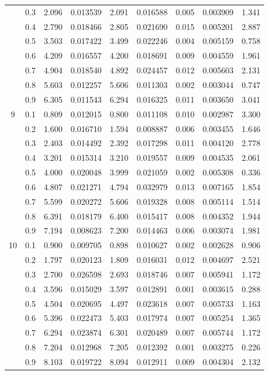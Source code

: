 \begin{longtable}{ | c | c || c | c | c | c | c | c | c | }
 & 0.3 & 2.096 & 0.013539 & 2.091 & 0.016588 & 0.005 & 0.003909 & 1.341 \\
 & 0.4 & 2.790 & 0.018466 & 2.805 & 0.021690 & 0.015 & 0.005201 & 2.887 \\
 & 0.5 & 3.503 & 0.017422 & 3.499 & 0.022246 & 0.004 & 0.005159 & 0.758 \\
 & 0.6 & 4.209 & 0.016557 & 4.200 & 0.018691 & 0.009 & 0.004559 & 1.961 \\
 & 0.7 & 4.904 & 0.018540 & 4.892 & 0.024457 & 0.012 & 0.005603 & 2.131 \\
 & 0.8 & 5.603 & 0.012257 & 5.606 & 0.011303 & 0.002 & 0.003044 & 0.747 \\
 & 0.9 & 6.305 & 0.011543 & 6.294 & 0.016325 & 0.011 & 0.003650 & 3.041 \\
 \hline
\multirow{9}{*}{9} & 0.1 & 0.809 & 0.012015 & 0.800 & 0.011108 & 0.010 & 0.002987 & 3.300 \\
 & 0.2 & 1.600 & 0.016710 & 1.594 & 0.008887 & 0.006 & 0.003455 & 1.646 \\
 & 0.3 & 2.403 & 0.014492 & 2.392 & 0.017298 & 0.011 & 0.004120 & 2.778 \\
 & 0.4 & 3.201 & 0.015314 & 3.210 & 0.019557 & 0.009 & 0.004535 & 2.061 \\
 & 0.5 & 4.000 & 0.020048 & 3.999 & 0.021059 & 0.002 & 0.005308 & 0.336 \\
 & 0.6 & 4.807 & 0.021271 & 4.794 & 0.032979 & 0.013 & 0.007165 & 1.854 \\
 & 0.7 & 5.599 & 0.020272 & 5.606 & 0.019328 & 0.008 & 0.005114 & 1.514 \\
 & 0.8 & 6.391 & 0.018179 & 6.400 & 0.015417 & 0.008 & 0.004352 & 1.944 \\
 & 0.9 & 7.194 & 0.008623 & 7.200 & 0.014463 & 0.006 & 0.003074 & 1.981 \\
 \hline
\multirow{9}{*}{10} & 0.1 & 0.900 & 0.009705 & 0.898 & 0.010627 & 0.002 & 0.002628 & 0.906 \\
 & 0.2 & 1.797 & 0.020123 & 1.809 & 0.016031 & 0.012 & 0.004697 & 2.521 \\
 & 0.3 & 2.700 & 0.026598 & 2.693 & 0.018746 & 0.007 & 0.005941 & 1.172 \\
 & 0.4 & 3.596 & 0.015029 & 3.597 & 0.012891 & 0.001 & 0.003615 & 0.288 \\
 & 0.5 & 4.504 & 0.020695 & 4.497 & 0.023618 & 0.007 & 0.005733 & 1.163 \\
 & 0.6 & 5.396 & 0.022473 & 5.403 & 0.017974 & 0.007 & 0.005254 & 1.365 \\
 & 0.7 & 6.294 & 0.023874 & 6.301 & 0.020489 & 0.007 & 0.005744 & 1.172 \\
 & 0.8 & 7.204 & 0.012968 & 7.205 & 0.012392 & 0.001 & 0.003275 & 0.226 \\
 & 0.9 & 8.103 & 0.019722 & 8.094 & 0.012911 & 0.009 & 0.004304 & 2.132 \\
 \hline
\hline
\end{longtable}
 
